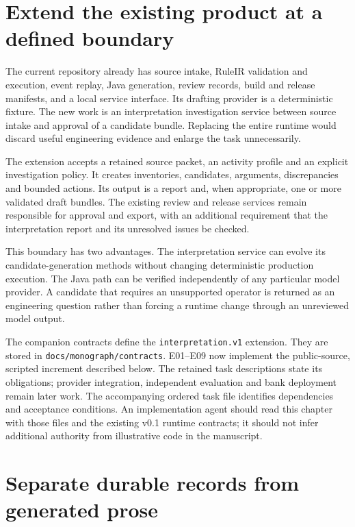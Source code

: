\section{Extend the existing product at a defined boundary}
\label{merge:M08:00}


The current repository already has source intake, RuleIR validation and execution,
event replay, Java generation, review records, build and release manifests, and a
local service interface. Its drafting provider is a deterministic fixture. The
new work is an interpretation investigation service between source intake and
approval of a candidate bundle. Replacing the entire runtime would discard useful
engineering evidence and enlarge the task unnecessarily.

The extension accepts a retained source packet, an activity profile and an
explicit investigation policy. It creates inventories, candidates, arguments,
discrepancies and bounded actions. Its output is a report and, when appropriate,
one or more validated draft bundles. The existing review and release services
remain responsible for approval and export, with an additional requirement that
the interpretation report and its unresolved issues be checked.


This boundary has two advantages. The interpretation service can evolve its
candidate-generation methods without changing deterministic production execution.
The Java path can be verified independently of any particular model provider.
A candidate that requires an unsupported operator is returned as an engineering
question rather than forcing a runtime change through an unreviewed model output.

The companion contracts define the \texttt{interpretation.v1} extension.
They are stored in \texttt{docs/monograph/contracts}. E01--E09 now implement
the public-source, scripted increment described below. The retained task
descriptions state its obligations; provider integration, independent
evaluation and bank deployment remain later work. The accompanying ordered task file identifies dependencies and acceptance conditions. An
implementation agent should read this chapter with those files and the existing
v0.1 runtime contracts; it should not infer additional authority from illustrative
code in the manuscript.

\section{Separate durable records from generated prose}
\label{merge:M08:01}


